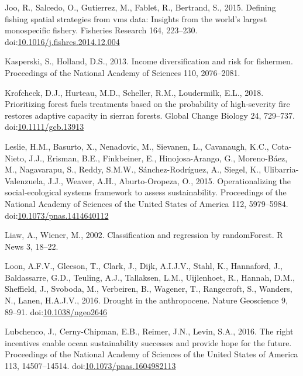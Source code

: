 \documentclass[]{elsarticle} %
\begin{document}
\leavevmode\hypertarget{ref-Joo2015}{}%
Joo, R., Salcedo, O., Gutierrez, M., Fablet, R., Bertrand, S., 2015.
Defining fishing spatial strategies from vms data: Insights from the
world's largest monospecific fishery. Fisheries Research 164, 223--230.
doi:\href{https://doi.org/10.1016/j.fishres.2014.12.004}{10.1016/j.fishres.2014.12.004}

\leavevmode\hypertarget{ref-Kasperski2013}{}%
Kasperski, S., Holland, D.S., 2013. Income diversification and risk for
fishermen. Proceedings of the National Academy of Sciences 110,
2076--2081.

\leavevmode\hypertarget{ref-Krofcheck2018}{}%
Krofcheck, D.J., Hurteau, M.D., Scheller, R.M., Loudermilk, E.L., 2018.
Prioritizing forest fuels treatments based on the probability of
high-severity fire restores adaptive capacity in sierran forests. Global
Change Biology 24, 729--737.
doi:\href{https://doi.org/10.1111/gcb.13913}{10.1111/gcb.13913}

\leavevmode\hypertarget{ref-Leslie2015}{}%
Leslie, H.M., Basurto, X., Nenadovic, M., Sievanen, L., Cavanaugh, K.C.,
Cota-Nieto, J.J., Erisman, B.E., Finkbeiner, E., Hinojosa-Arango, G.,
Moreno-Báez, M., Nagavarapu, S., Reddy, S.M.W., Sánchez-Rodríguez, A.,
Siegel, K., Ulibarria-Valenzuela, J.J., Weaver, A.H., Aburto-Oropeza,
O., 2015. Operationalizing the social-ecological systems framework to
assess sustainability. Proceedings of the National Academy of Sciences
of the United States of America 112, 5979--5984.
doi:\href{https://doi.org/10.1073/pnas.1414640112}{10.1073/pnas.1414640112}

\leavevmode\hypertarget{ref-Wiener2003}{}%
Liaw, A., Wiener, M., 2002. Classification and regression by
randomForest. R News 3, 18--22.

\leavevmode\hypertarget{ref-VanLoon2016}{}%
Loon, A.F.V., Gleeson, T., Clark, J., Dijk, A.I.J.V., Stahl, K.,
Hannaford, J., Baldassarre, G.D., Teuling, A.J., Tallaksen, L.M.,
Uijlenhoet, R., Hannah, D.M., Sheffield, J., Svoboda, M., Verbeiren, B.,
Wagener, T., Rangecroft, S., Wanders, N., Lanen, H.A.J.V., 2016. Drought
in the anthropocene. Nature Geoscience 9, 89--91.
doi:\href{https://doi.org/10.1038/ngeo2646}{10.1038/ngeo2646}

\leavevmode\hypertarget{ref-Lubchenco2016}{}%
Lubchenco, J., Cerny-Chipman, E.B., Reimer, J.N., Levin, S.A., 2016. The
right incentives enable ocean sustainability successes and provide hope
for the future. Proceedings of the National Academy of Sciences of the
United States of America 113, 14507--14514.
doi:\href{https://doi.org/10.1073/pnas.1604982113}{10.1073/pnas.1604982113}
\end{document}
